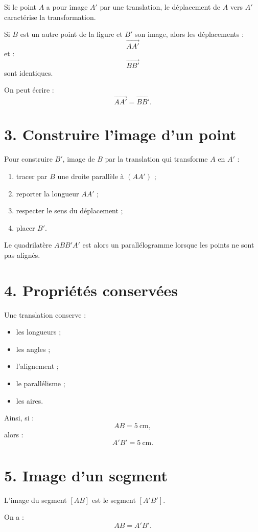 Si le point $A$ a pour image $A'$ par une translation, le déplacement de $A$ vers $A'$ caractérise la transformation.

Si $B$ est un autre point de la figure et $B'$ son image, alors les déplacements :
\[
\overrightarrow{AA'}
\]
et :
\[
\overrightarrow{BB'}
\]
sont identiques.

On peut écrire :
\[
\boxed{\overrightarrow{AA'}=\overrightarrow{BB'}}.
\]

\section{3. Construire l'image d'un point}

Pour construire $B'$, image de $B$ par la translation qui transforme $A$ en $A'$ :
\begin{enumerate}
\item tracer par $B$ une droite parallèle à $(AA')$ ;
\item reporter la longueur $AA'$ ;
\item respecter le sens du déplacement ;
\item placer $B'$.
\end{enumerate}

Le quadrilatère $ABB'A'$ est alors un parallélogramme lorsque les points ne sont pas alignés.

\section{4. Propriétés conservées}

Une translation conserve :
\begin{itemize}
\item les longueurs ;
\item les angles ;
\item l'alignement ;
\item le parallélisme ;
\item les aires.
\end{itemize}

Ainsi, si :
\[
AB=5\ \text{cm},
\]
alors :
\[
A'B'=5\ \text{cm}.
\]

\section{5. Image d'un segment}

L'image du segment $[AB]$ est le segment $[A'B']$.

On a :
\[
AB=A'B'.
\]

